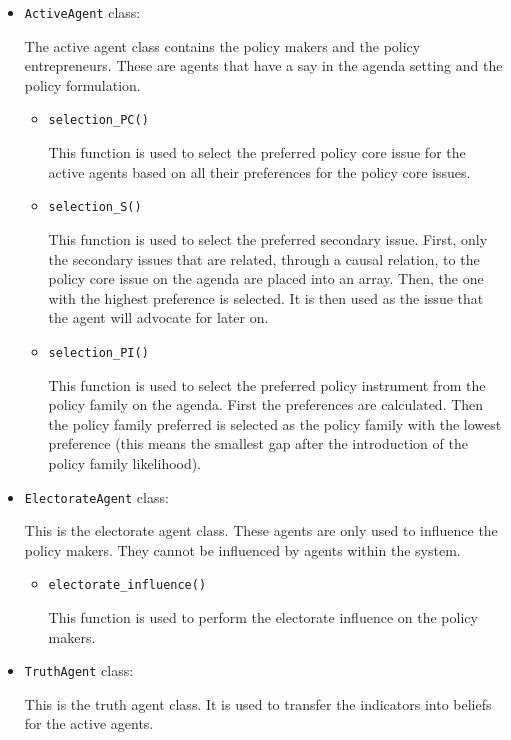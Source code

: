 \documentclass[11pt]{article}
\begin{document}
\begin{itemize}
\item \texttt{ActiveAgent} class:

The active agent class contains the policy makers and the policy entrepreneurs. These are agents that have a say in the agenda setting and the policy formulation.

	\begin{itemize}
	\item \texttt{selection\_PC()}
	
	This function is used to select the preferred policy core issue for the active agents based on all their preferences for the policy core issues.
	
	\item \texttt{selection\_S()}
	
	This function is used to select the preferred secondary issue. First, only the secondary issues that are related, through a causal relation, to the policy core issue on the agenda are placed into an array. Then, the one with the highest preference is selected. It is then used as the issue that the agent will advocate for later on.
	\item \texttt{selection\_PI()}
	
	This function is used to select the preferred policy instrument from the policy family on the agenda. First the preferences are calculated. Then the policy family preferred is selected as the policy family with the lowest preference (this means the smallest gap after the introduction of the policy family likelihood).

	\end{itemize}

\item \texttt{ElectorateAgent} class:

This is the electorate agent class. These agents are only used to influence the policy makers. They cannot be influenced by agents within the system.

	\begin{itemize}
	\item \texttt{electorate\_influence()}
	
	This function is used to perform the electorate influence on the policy makers.
	\end{itemize}
	
\item \texttt{TruthAgent} class:

This is the truth agent class. It is used to transfer the indicators into beliefs for the active agents.

\end{itemize}
\end{document}
